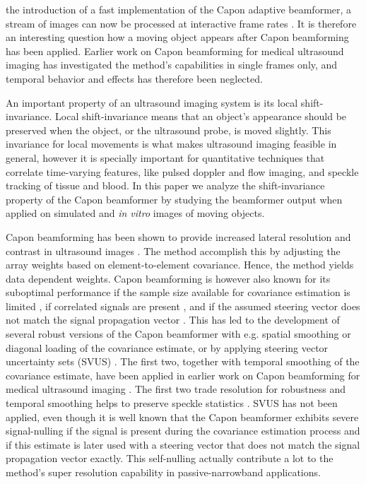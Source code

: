\documentclass[journal]{IEEEtran}
\begin{document}
 the introduction of a fast implementation of the Capon adaptive beamformer, a stream of images can now be processed at interactive frame rates \cite{Asen}. It is therefore an interesting question how a moving object appears after Capon beamforming has been applied. Earlier work on Capon beamforming for medical ultrasound imaging has investigated the method's capabilities in single frames only, and temporal behavior and effects has therefore been neglected. 

An important property of an ultrasound imaging system is its local shift-invariance. Local shift-invariance means that an object’s appearance should be preserved when the object, or the ultrasound probe, is moved slightly. This invariance for local movements is what makes ultrasound imaging feasible in general, however it is specially important for quantitative techniques that correlate time-varying features, like pulsed doppler and flow imaging, and speckle tracking of tissue and blood. In this paper we analyze the shift-invariance property of the Capon beamformer by studying the beamformer output when applied on simulated and \textit{in vitro} images of moving objects. 

Capon beamforming has been shown to provide increased lateral resolution and contrast in ultrasound images \cite{Synnevag2007, Synnevag2009, Chen2011}. The method accomplish this by adjusting the array weights based on element-to-element covariance. Hence, the method yields data dependent weights. Capon beamforming is however also known for its suboptimal performance if the sample size available for covariance estimation is limited \cite{Mestre2006}, if correlated signals are present \cite{Widrow1982}, and if the assumed steering vector does not match the signal propagation vector \cite{Wax1996, Wax1996a}. This has led to the development of several robust versions of the Capon beamformer with e.g. spatial smoothing \cite{Shan1985} or diagonal loading \cite{JianLi2003} of the covariance estimate, or by applying steering vector uncertainty sets (SVUS) \cite{Lorenz2005, Rubsamen2013}. The first two, together with temporal smoothing of the covariance estimate, have been applied in earlier work on Capon beamforming for medical ultrasound imaging \cite{Synnevag2009}. The first two trade resolution for robustness and temporal smoothing helps to preserve speckle statistics \cite{Synnevag2007a}. SVUS has not been applied, even though it is well known that the Capon beamformer exhibits severe signal-nulling if the signal is present during the covariance estimation process and if this estimate is later used with a steering vector that does not match the signal propagation vector exactly. This self-nulling actually contribute a lot to the method's super resolution capability in passive-narrowband applications. 
\end{document}
